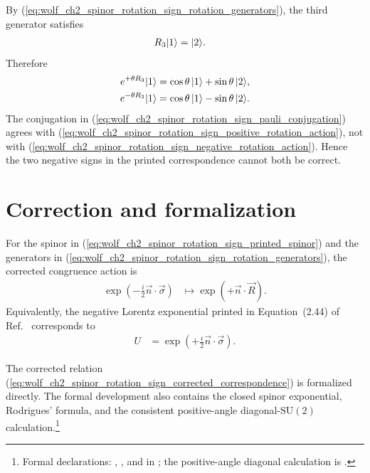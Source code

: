 \documentclass{article}
\begin{document}
By
(\ref{eq:wolf_ch2_spinor_rotation_sign_rotation_generators}), the third
generator satisfies
\begin{align}
    R_3|1\rangle
        &=|2\rangle.
    \label{eq:wolf_ch2_spinor_rotation_sign_generator_action}
\end{align}
Therefore
\begin{align}
    e^{+\theta R_3}|1\rangle
        &=\cos\theta\,|1\rangle+\sin\theta\,|2\rangle,
    \label{eq:wolf_ch2_spinor_rotation_sign_positive_rotation_action}\\
    e^{-\theta R_3}|1\rangle
        &=\cos\theta\,|1\rangle-\sin\theta\,|2\rangle.
    \label{eq:wolf_ch2_spinor_rotation_sign_negative_rotation_action}
\end{align}
The conjugation in
(\ref{eq:wolf_ch2_spinor_rotation_sign_pauli_conjugation}) agrees with
(\ref{eq:wolf_ch2_spinor_rotation_sign_positive_rotation_action}), not with
(\ref{eq:wolf_ch2_spinor_rotation_sign_negative_rotation_action}). Hence the
two negative signs in the printed correspondence cannot both be correct.

\section{Correction and formalization}

For the spinor in
(\ref{eq:wolf_ch2_spinor_rotation_sign_printed_spinor}) and the generators in
(\ref{eq:wolf_ch2_spinor_rotation_sign_rotation_generators}), the corrected
congruence action is
\begin{align}
    \exp\!\left(-\frac{i}{2}\vec n\mathbin{\cdot}\vec\sigma\right)
        &\longmapsto
          \exp\!\left(+\vec n\mathbin{\cdot}\vec R\right).
    \label{eq:wolf_ch2_spinor_rotation_sign_corrected_correspondence}
\end{align}
Equivalently, the negative Lorentz exponential printed in Equation~(2.44) of
Ref.~\cite{Wolf2012Quantum} corresponds to
\begin{align}
    U
        &=\exp\!\left(+\frac{i}{2}\vec n\mathbin{\cdot}\vec\sigma\right).
    \label{eq:wolf_ch2_spinor_rotation_sign_equivalent_spinor}
\end{align}

The corrected relation
(\ref{eq:wolf_ch2_spinor_rotation_sign_corrected_correspondence}) is
formalized directly. The formal development also contains the closed spinor
exponential, Rodrigues' formula, and the consistent positive-angle
diagonal-$\mathrm{SU}(2)$ calculation.\footnote{Formal declarations:
,
, and
 in
; the
positive-angle diagonal calculation is
.}
\end{document}
